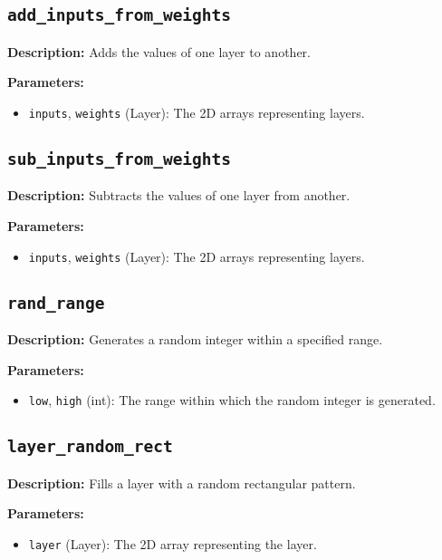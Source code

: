 \documentclass{article}
\begin{document}
\subsection*{\texttt{add\_inputs\_from\_weights}}

\textbf{Description:} Adds the values of one layer to another.

\textbf{Parameters:}
\begin{itemize}
    \item \texttt{inputs}, \texttt{weights} (Layer): The 2D arrays representing layers.
\end{itemize}

\subsection*{\texttt{sub\_inputs\_from\_weights}}

\textbf{Description:} Subtracts the values of one layer from another.

\textbf{Parameters:}
\begin{itemize}
    \item \texttt{inputs}, \texttt{weights} (Layer): The 2D arrays representing layers.
\end{itemize}

\subsection*{\texttt{rand\_range}}

\textbf{Description:} Generates a random integer within a specified range.

\textbf{Parameters:}
\begin{itemize}
    \item \texttt{low}, \texttt{high} (int): The range within which the random integer is generated.
\end{itemize}

\subsection*{\texttt{layer\_random\_rect}}

\textbf{Description:} Fills a layer with a random rectangular pattern.

\textbf{Parameters:}
\begin{itemize}
    \item \texttt{layer} (Layer): The 2D array representing the layer.
\end{itemize}
\end{document}
